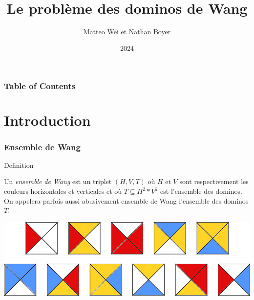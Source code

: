 \documentclass{beamer}
\title{Le problème des dominos de Wang}
\author{Matteo Wei et Nathan Boyer}
\date{2024}
\newcommand{\sube}{\subseteq}
\begin{document}
\frame{\titlepage}

\begin{frame}
    \frametitle{Table of Contents}
    \tableofcontents[]
  \end{frame}
  
\section{Introduction}
\begin{frame}
\frametitle{Ensemble de Wang}

\begin{alertblock}{Definition}

    Un \emph{ensemble de Wang} est un triplet $(H,V,T)$ où $H$ et $V$ sont respectivement les couleurs horizontales et verticales
    et où $T \sube H^2 * V^2$ est l'ensemble des dominos. On appelera parfois aussi abusivement ensemble de Wang l'ensemble des dominos $T$.
    
\end{alertblock}

\includegraphics{ensemble_de_wang_exemple}

\end{frame}
\end{document}
